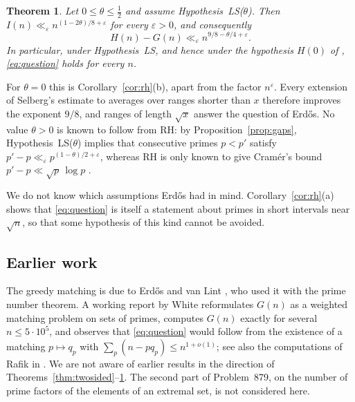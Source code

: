 \documentclass[11pt,reqno]{amsart}
\newtheorem{theorem}{Theorem}[section]
\theoremstyle{definition}
\theoremstyle{remark}
\numberwithin{equation}{section}
\newcommand{\eps}{\varepsilon}
\begin{document}
\begin{theorem}\label{thm:ls}
Let $0\le\theta\le\frac12$ and assume Hypothesis~LS($\theta$). Then $I(n)\ll_\eps n^{(1-2\theta)/8+\eps}$ for every $\eps>0$, and consequently
\[
 H(n)-G(n)\ll_\eps n^{9/8-\theta/4+\eps}.
\]
In particular, under Hypothesis~LS, and hence under the hypothesis $H(0)$ of \cite{LPZ}, \eqref{eq:question} holds for every $n$.
\end{theorem}

For $\theta=0$ this is Corollary~\ref{cor:rh}(b), apart from the factor $n^\eps$. Every extension of Selberg's estimate to averages over ranges shorter than $x$ therefore improves the exponent $9/8$, and ranges of length $\sqrt x$ answer the question of Erd\H{o}s. No value $\theta>0$ is known to follow from RH: by Proposition~\ref{prop:gaps}, Hypothesis~LS($\theta$) implies that consecutive primes $p<p'$ satisfy $p'-p\ll_\eps p^{(1-\theta)/2+\eps}$, whereas RH is only known to give Cram\'er's bound $p'-p\ll\sqrt p\,\log p$ \cite{Cr,CMS}.

We do not know which assumptions Erd\H{o}s had in mind. Corollary~\ref{cor:rh}(a) shows that \eqref{eq:question} is itself a statement about primes in short intervals near $\sqrt n$, so that some hypothesis of this kind cannot be avoided.

\subsection{Earlier work}
The greedy matching is due to Erd\H{o}s and van Lint \cite{EvL}, who used it with the prime number theorem. A working report by White \cite{Wh} reformulates $G(n)$ as a weighted matching problem on sets of primes, computes $G(n)$ exactly for several $n\le5\cdot10^5$, and observes that \eqref{eq:question} would follow from the existence of a matching $p\mapsto q_p$ with $\sum_p(n-pq_p)\le n^{1+o(1)}$; see also the computations of Rafik in \cite{Bl}. We are not aware of earlier results in the direction of Theorems~\ref{thm:twosided}--\ref{thm:ls}. The second part of Problem~879, on the number of prime factors of the elements of an extremal set, is not considered here.
\end{document}
